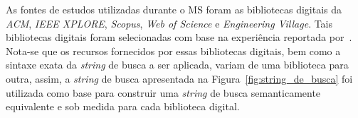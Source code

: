As fontes de estudos utilizadas durante o MS foram as bibliotecas digitais da \textit{ACM}, 
\textit{IEEE XPLORE}, \textit{Scopus}, \textit{Web of Science} e \textit{Engineering Village}. Tais bibliotecas digitais foram selecionadas com base na experiência reportada por~. Nota-se que os recursos fornecidos por essas bibliotecas digitais, bem como a sintaxe exata da \textit{string} de busca a ser aplicada, variam de uma biblioteca para outra, assim, a \textit{string} de busca apresentada na Figura~\ref{fig:string_de_busca} foi utilizada como base para construir uma \textit{string} de busca semanticamente equivalente e sob medida para cada biblioteca digital. %


 
 
 
 
 

